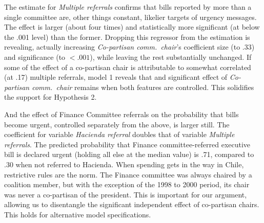 \documentclass[letter,12pt]{article}
\begin{document}
The estimate for \emph{Multiple referrals} confirms that bills reported by more than a single committee are, other things constant, likelier targets of urgency messages. The effect is larger (about four times) and statistically more significant (at below the .001 level) than the former. Dropping this regressor from the estimation is revealing, actually increasing \emph{Co-partisan comm.~chair}'s coefficient size (to .33) and significance (to $<.001$), while leaving the rest substantially unchanged. If some of the effect of a co-partisan chair is attributable to somewhat correlated (at .17) multiple referrals, model 1 reveals that and significant effect of \emph{Co-partisan comm.~chair} remains when both features are controlled. This solidifies the support for Hypothesis 2. 

And the effect of Finance Committee referrals on the probability that bills become urgent, controlled separately from the above, is larger still. The coefficient for variable \emph{Hacienda referral} doubles that of variable \emph{Multiple referrals}. The predicted probability that Finance committee-referred executive bill is declared urgent (holding all else at the median value) is .71, compared to .30 when not referred to Hacienda. When spending gets in the way in Chile, restrictive rules are the norm. The Finance committee was always chaired by a coalition member, but with the exception of the 1998 to 2000 period, its chair was never a co-partisan of the president. This is important for our argument, allowing us to disentangle the significant independent effect of co-partisan chairs. This holds for alternative model specifications. 

\end{document}
